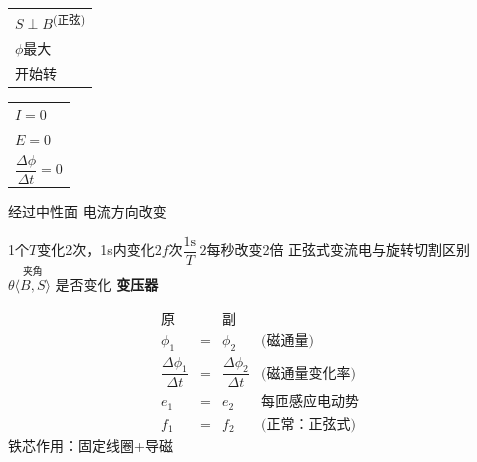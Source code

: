 \medskip
\noindent\begin{tabular}[t]{@{}l@{}}$S\perp B$\textsuperscript{\scriptsize(正弦)}\\[3pt] $\phi$最大\\[3pt] 开始转\end{tabular}\quad
\begin{tabular}[t]{@{}l@{}}$I=0$\\[3pt] $E=0$\\[3pt] $\dfrac{\Delta\phi}{\Delta t}=0$\end{tabular}

经过中性面 电流方向改变

\medskip
\noindent 1个$T$变化2次，1s内变化$2f$次\quad $\dfrac{1\mathrm{s}}{T}\,2$\quad 每秒改变2倍
正弦式变流电与旋转切割区别\quad $\theta\overset{\text{夹角}}{\langle B,S\rangle}$ 是否变化%
\textbf{变压器}

\[
\begin{array}{lcll}
\text{原} & & \text{副} & \\[2pt]
\phi_1 & = & \phi_2 & \text{(磁通量)}\\[6pt]
\dfrac{\Delta\phi_1}{\Delta t} & = & \dfrac{\Delta\phi_2}{\Delta t} & \text{(磁通量变化率)}\\[10pt]
e_1 & = & e_2 & \text{每匝感应电动势}\\[6pt]
f_1 & = & f_2 & \text{(正常：正弦式)}
\end{array}
\]
铁芯作用：固定线圈+导磁
